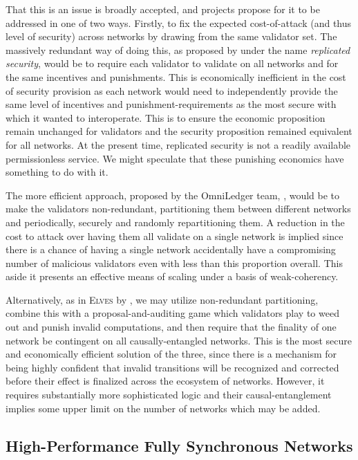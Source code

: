 That this is an issue is broadly accepted, and projects propose for it to be addressed in one of two ways. Firstly, to fix the expected cost-of-attack (and thus level of security) across networks by drawing from the same validator set. The massively redundant way of doing this, as proposed by \cite{cosmos2024interchain} under the name \emph{replicated security}, would be to require each validator to validate on all networks and for the same incentives and punishments. This is economically inefficient in the cost of security provision as each network would need to independently provide the same level of incentives and punishment-requirements as the most secure with which it wanted to interoperate. This is to ensure the economic proposition remain unchanged for validators and the security proposition remained equivalent for all networks. At the present time, replicated security is not a readily available permissionless service. We might speculate that these punishing economics have something to do with it.

The more efficient approach, proposed by the OmniLedger team, \cite{cryptoeprint:2017/406}, would be to make the validators non-redundant, partitioning them between different networks and periodically, securely and randomly repartitioning them. A reduction in the cost to attack over having them all validate on a single network is implied since there is a chance of having a single network accidentally have a compromising number of malicious validators even with less than this proportion overall. This aside it presents an effective means of scaling under a basis of weak-coherency.

Alternatively, as in \textsc{Elves} by \cite{stewart2018efficient}, we may utilize non-redundant partitioning, combine this with a proposal-and-auditing game which validators play to weed out and punish invalid computations, and then require that the finality of one network be contingent on all causally-entangled networks. This is the most secure and economically efficient solution of the three, since there is a mechanism for being highly confident that invalid transitions will be recognized and corrected before their effect is finalized across the ecosystem of networks. However, it requires substantially more sophisticated logic and their causal-entanglement implies some upper limit on the number of networks which may be added.

\subsection{High-Performance Fully Synchronous Networks}

